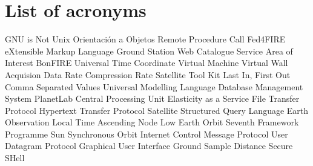 \chapter{List of acronyms}

{\small
\begin{acronym}[XXXXXXXX]
       {\acs{GNU} is Not Unix}
        {Orientación a Objetos}
       {Remote Procedure Call}
       {Fed4FIRE}
      {eXtensible Markup Language}
      {Ground Station}
      {Web Catalogue Service}
     {Area of Interest}
      {BonFIRE}
    {Universal Time Coordinate}
     {Virtual Machine}
     {Virtual Wall}
    {Acquision Data Rate}
     {Compression Rate}
    {Satellite Tool Kit}
   {Last In, First Out}
    {Comma Separated Values}
    {Universal Modelling Language}
   {Database Management System}
     {PlanetLab}
    {Central Processing Unit}
   {Elasticity as a Service}
    {File Transfer Protocol}
   {Hypertext Transfer Protocol}
    {Satellite}
    {Structured Query Language}
  {Earth Observation}
  {Local Time Ascending Node}
  {Low Earth Orbit}
 {Seventh Framework Programme}
 {Sun Synchronous Orbit}
 {Internet Control Message Protocol}
 {User Datagram Protocol}
 {Graphical User Interface}
 {Ground Sample Distance}
 {Secure SHell}
\end{acronym}
}




